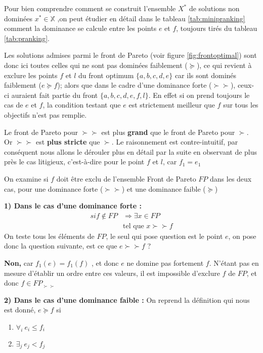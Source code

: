 Pour bien comprendre comment se construit l'ensemble $X^*$ de solutions non dominées $x^* \in \mathbb{X}$ ,on peut étudier en détail dans le tableau \ref{tab:minipranking} comment la dominance se calcule entre les points $e$ et $f$, toujours tirés du tableau \ref{tab:pranking}.

Les solutions admises parmi le front de Pareto (voir figure \ref{fig:frontoptimal}) sont donc ici toutes celles qui ne sont pas dominées faiblement ($\succeq$), ce qui revient à exclure les points $f$ et $l$ du front optimum $\{a,b,c,d,e\}$ car ils sont dominés faiblement ($e \succeq f$); alors que dans le cadre d'une dominance forte ($\succ \succ$), ceux-ci auraient fait partie du front $\{a,b,c,d,e,f,l\}$. En effet si on prend toujours le cas de $e$ et $f$, la condition testant que $e$ est strictement meilleur que $f$ sur tous les objectifs n'est pas remplie.


Le front de Pareto pour $\succ \succ$ est plus \textbf{grand} que le front de Pareto pour $ \succ $. Or $\succ \succ$ est \textbf{plus stricte} que $\succ$. Le raisonnement est contre-intuitif, par conséquent nous allons le dérouler plus en détail par la suite en observant de plus près le cas litigieux, c'est-à-dire pour le point $f$ et $l$, car $f_1 = e_1$

On examine si $f$ doit être exclu de l'ensemble Front de Pareto $FP$ dans les deux cas, pour une dominance forte ($\succ \succ$) et une dominance faible ($\succeq$)

\textbf{1) Dans le cas d'une dominance forte : }
\begin{align*}
     si f \notin FP & \Rightarrow \exists x \in FP \\
     & \text{tel que }  x \succ \succ f
\end{align*}
On teste tous les éléments de $FP$, le seul qui pose question est le point $e$, on pose donc la question suivante, est ce que $e \succ \succ f$ ?

\textbf{Non,} car $f_1(e) = f_1(f)$ , et donc $e$ ne domine pas fortement $f$. N'étant pas en mesure d'établir un ordre entre ces valeurs, il est impossible d'exclure $f$ de $FP$, et donc $ f \in FP_{\succ \succ}$

\textbf{2) Dans le cas d'une dominance faible : }
On reprend la définition qui nous est donné, $ e \succeq f$ si
\begin{enumerate}[label=(\arabic*),labelindent=\parindent,leftmargin=*]
\item $ \forall_i \ e_i \leq f_i$
\item $ \exists_j \ e_j < f_j$
\end{enumerate}


